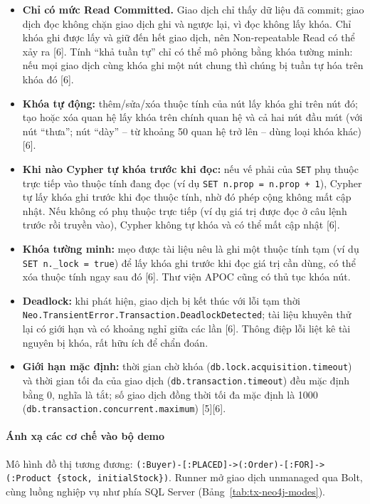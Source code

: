 \begin{itemize}
    \item \textbf{Chỉ có mức Read Committed.} Giao dịch chỉ thấy dữ liệu đã commit; giao dịch đọc không chặn giao dịch ghi và ngược lại, vì đọc không lấy khóa. Chỉ khóa ghi được lấy và giữ đến hết giao dịch, nên Non-repeatable Read có thể xảy ra [6]. Tính ``khả tuần tự'' chỉ có thể mô phỏng bằng khóa tường minh: nếu mọi giao dịch cùng khóa ghi một nút chung thì chúng bị tuần tự hóa trên khóa đó [6].
    \item \textbf{Khóa tự động:} thêm/sửa/xóa thuộc tính của nút lấy khóa ghi trên nút đó; tạo hoặc xóa quan hệ lấy khóa trên chính quan hệ và cả hai nút đầu mút (với nút ``thưa''; nút ``dày'' -- từ khoảng 50 quan hệ trở lên -- dùng loại khóa khác) [6].
    \item \textbf{Khi nào Cypher tự khóa trước khi đọc:} nếu vế phải của \texttt{SET} phụ thuộc trực tiếp vào thuộc tính đang đọc (ví dụ \texttt{SET n.prop = n.prop + 1}), Cypher tự lấy khóa ghi trước khi đọc thuộc tính, nhờ đó phép cộng không mất cập nhật. Nếu không có phụ thuộc trực tiếp (ví dụ giá trị được đọc ở câu lệnh trước rồi truyền vào), Cypher không tự khóa và có thể mất cập nhật [6].
    \item \textbf{Khóa tường minh:} mẹo được tài liệu nêu là ghi một thuộc tính tạm (ví dụ \texttt{SET n.\_lock = true}) để lấy khóa ghi trước khi đọc giá trị cần dùng, có thể xóa thuộc tính ngay sau đó [6]. Thư viện APOC cũng có thủ tục khóa nút.
    \item \textbf{Deadlock:} khi phát hiện, giao dịch bị kết thúc với lỗi tạm thời \texttt{Neo.TransientError.Transaction.DeadlockDetected}; tài liệu khuyên thử lại có giới hạn và có khoảng nghỉ giữa các lần [6]. Thông điệp lỗi liệt kê tài nguyên bị khóa, rất hữu ích để chẩn đoán.
    \item \textbf{Giới hạn mặc định:} thời gian chờ khóa (\texttt{db.lock.acquisition.timeout}) và thời gian tối đa của giao dịch (\texttt{db.transaction.timeout}) đều mặc định bằng 0, nghĩa là tắt; số giao dịch đồng thời tối đa mặc định là 1000 (\texttt{db.transaction.concurrent.maximum}) [5][6].
\end{itemize}

\paragraph{Ánh xạ các cơ chế vào bộ demo}\mbox{}

Mô hình đồ thị tương đương: \texttt{(:Buyer)-[:PLACED]->(:Order)-[:FOR]->(:Product \{stock, initialStock\})}. Runner mở giao dịch unmanaged qua Bolt, cùng luồng nghiệp vụ như phía SQL Server (Bảng~\ref{tab:tx-neo4j-modes}).

